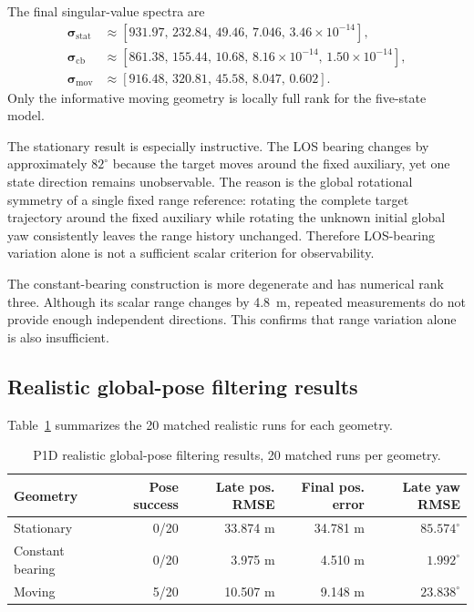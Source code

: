 The final singular-value spectra are
\begin{align}
\bm\sigma_{\mathrm{stat}}
&\approx
[931.97,\,232.84,\,49.46,\,7.046,\,3.46\times10^{-14}],\\
\bm\sigma_{\mathrm{cb}}
&\approx
[861.38,\,155.44,\,10.68,\,8.16\times10^{-14},\,1.50\times10^{-14}],\\
\bm\sigma_{\mathrm{mov}}
&\approx
[916.48,\,320.81,\,45.58,\,8.047,\,0.602].
\end{align}
Only the informative moving geometry is locally full rank for the five-state model.

The stationary result is especially instructive. The LOS bearing changes by approximately $82^{\circ}$ because the target moves around the fixed auxiliary, yet one state direction remains unobservable. The reason is the global rotational symmetry of a single fixed range reference: rotating the complete target trajectory around the fixed auxiliary while rotating the unknown initial global yaw consistently leaves the range history unchanged. Therefore LOS-bearing variation alone is not a sufficient scalar criterion for observability.

The constant-bearing construction is more degenerate and has numerical rank three. Although its scalar range changes by \SI{4.8}{m}, repeated measurements do not provide enough independent directions. This confirms that range variation alone is also insufficient.

\subsection{Realistic global-pose filtering results}
Table~\ref{tab:p1d_realistic} summarizes the 20 matched realistic runs for each geometry.
\begin{table}[ht]
\centering
\caption{P1D realistic global-pose filtering results, 20 matched runs per geometry.}
\label{tab:p1d_realistic}
\begin{tabular}{lrrrr}
\toprule
Geometry & Pose success & Late pos. RMSE & Final pos. error & Late yaw RMSE\\
\midrule
Stationary & 0/20 & 33.874 m & 34.781 m & $85.574^{\circ}$\\
Constant bearing & 0/20 & 3.975 m & 4.510 m & $1.992^{\circ}$\\
Moving & 5/20 & 10.507 m & 9.148 m & $23.838^{\circ}$\\
\bottomrule
\end{tabular}
\end{table}

